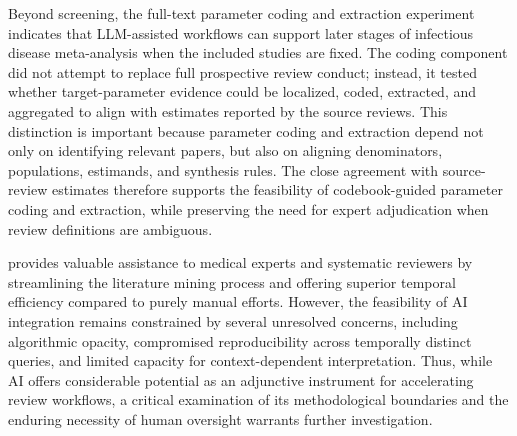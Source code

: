 Beyond screening, the full-text parameter coding and extraction experiment indicates that LLM-assisted workflows can support later stages of infectious disease meta-analysis when the included studies are fixed. The coding component did not attempt to replace full prospective review conduct; instead, it tested whether target-parameter evidence could be localized, coded, extracted, and aggregated to align with estimates reported by the source reviews. This distinction is important because parameter coding and extraction depend not only on identifying relevant papers, but also on aligning denominators, populations, estimands, and synthesis rules. The close agreement with source-review estimates therefore supports the feasibility of codebook-guided parameter coding and extraction, while preserving the need for expert adjudication when review definitions are ambiguous.

\metagent{} provides valuable assistance to medical experts and systematic reviewers by streamlining the literature mining process and offering superior temporal efficiency compared to purely manual efforts. However, the feasibility of AI integration remains constrained by several unresolved concerns, including algorithmic opacity, compromised reproducibility across temporally distinct queries, and limited capacity for context-dependent interpretation.\cite{ref28} Thus, while AI offers considerable potential as an adjunctive instrument for accelerating review workflows, a critical examination of its methodological boundaries and the enduring necessity of human oversight warrants further investigation.\cite{ref29,ref30}

